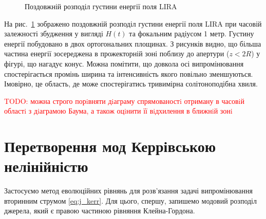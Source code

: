 \begin{figure}
\caption{Поздовжній розподіл густини енергії поля LIRA}
\label{fig:long_dist}
\end{figure}

На рис.~\ref{fig:long_dist} зображено поздовжній розподіл густини енергії 
поля LIRA при часовій залежності збудження у вигляді $ H(t) $ та фокальним 
радіусом 1 метр. Густину енергії побудовано в двох ортогональних площинах.
З рисунків видно, що більша частина енергії зосереджена в прожекторній зоні 
поблизу до апертури ($ z < 2R $) у фігурі, що нагадує конус. Можна помітити, 
що довкола осі випромінювання спостерігається промінь ширина та інтенсивність 
якого повільно зменшуються. Імовірно, це область, де може спостерігатись 
тривимірна солітоноподібна хвиля.

\textcolor{red}{TODO: можна строго порiвняти дiаграму спрямованостi отриману в
часовiй областi з дiаграмою Баума, а також оцiнити її вiдхилення в ближнiй
зонi}

\section{Перетворення мод Керрівською нелінійністю}

Застосуємо метод еволюційних рівнянь для розв'язання задачі випромінювання 
вторинним струмом \eqref{eq:j_kerr}. Для цього, спершу, запишемо модовий
розподіл джерела, який є правою частиною рівняння Клейна-Гордона. 

